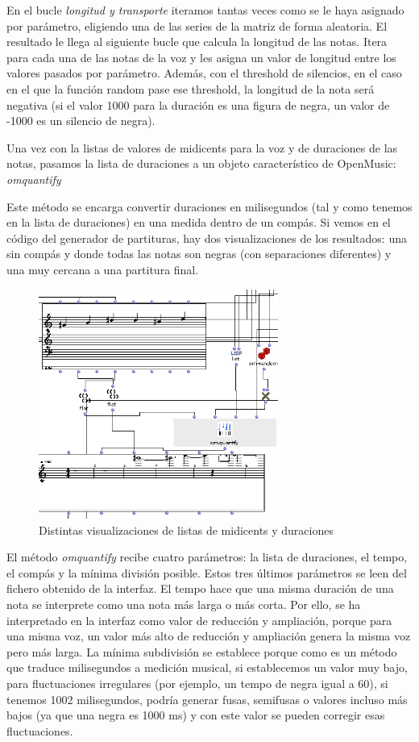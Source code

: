\documentclass[a4paper,openany,12pt]{memoir}
\begin{document}
En el bucle \emph{longitud y transporte} iteramos tantas veces como se le haya asignado por parámetro, eligiendo una de las series de la matriz de forma aleatoria. El resultado le llega al siguiente bucle que calcula la longitud de las notas. Itera para cada una de las notas de la voz y les asigna un valor de longitud entre los valores pasados por parámetro. Además, con el threshold de silencios, en el caso en el que la función random pase ese threshold, la longitud de la nota será negativa (si el valor 1000 para la duración es una figura de negra, un valor de -1000 es un silencio de negra).

Una vez con la listas de valores de midicents para la voz y de duraciones de las notas, pasamos la lista de duraciones a un objeto característico de OpenMusic: \emph{omquantify}

Este método se encarga convertir duraciones en milisegundos (tal y como tenemos en la lista de duraciones) en una medida dentro de un compás. Si vemos en el código del generador de partituras, hay dos visualizaciones de los resultados: una sin compás y donde todas las notas son negras (con separaciones diferentes) y una muy cercana a una partitura final.

\begin{figure}
\centering
\includegraphics[width=0.7\textwidth]{img/visores.png}
\caption{Distintas visualizaciones de listas de midicents y duraciones} \label{fig:visores}
\end{figure}

El método \emph{omquantify} recibe cuatro parámetros: la lista de duraciones, el tempo, el compás y la mínima división posible. Estos tres últimos parámetros se leen del fichero obtenido de la interfaz. El tempo hace que una misma duración de una nota se interprete como una nota más larga o más corta. Por ello, se ha interpretado en la interfaz como valor de reducción y ampliación, porque para una misma voz, un valor más alto de reducción y ampliación genera la misma voz pero más larga. La mínima subdivisión se establece porque como es un método que traduce milisegundos a medición musical, si establecemos un valor muy bajo, para fluctuaciones irregulares (por ejemplo, un tempo de negra igual a 60), si tenemos 1002 milisegundos, podría generar fusas, semifusas o valores incluso más bajos (ya que una negra es 1000 ms) y con este valor se pueden corregir esas fluctuaciones.
\end{document}
